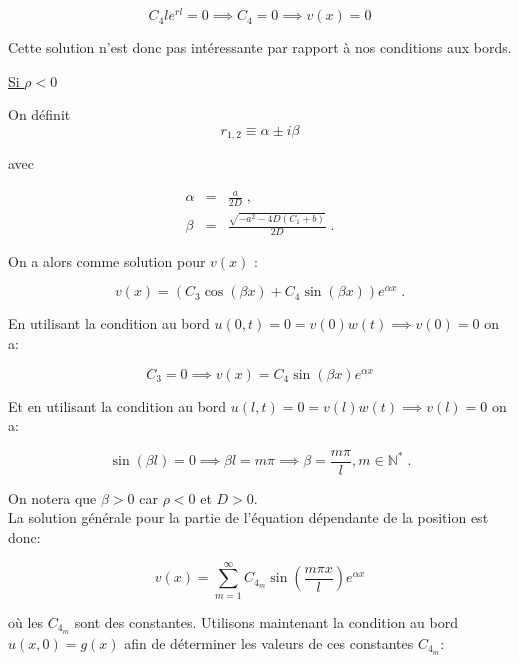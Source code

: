 \documentclass[a4paper, 12pt]{report}
\begin{document}
\begin{equation}
  C_4 l e^{r l} = 0 \implies C_4 = 0 \implies v(x) = 0
\end{equation}

Cette solution n'est donc pas intéressante par rapport à nos conditions aux bords.

\underline{Si $\rho < 0$}

On définit
\begin{equation}
r_{1,2} \equiv \alpha \pm i \beta
\end{equation}

avec

\begin{eqnarray}
  \alpha & = & \frac{a}{2 D}\;,\\
  \beta & = & \frac{\sqrt{-a^{2} - 4 D (C_{1} + b)}}{2 D}\;.\label{beta}
\end{eqnarray}

On a alors comme solution pour $v(x)$ :

\begin{equation}
  v(x) = (C_3 \cos(\beta x) + C_4 \sin(\beta x)) e^{\alpha x}\;.
\end{equation}

En utilisant la condition au bord $u(0,t) = 0 = v(0) w(t) \implies v(0) = 0$ on a:

\begin{equation}
  C_3 = 0 \implies v(x) = C_4 \sin(\beta x) e^{\alpha x}
\end{equation}

Et en utilisant la condition au bord $u(l,t) = 0 = v(l) w(t) \implies v(l) = 0$ on a:

\begin{equation}
  \sin(\beta l) = 0 \implies \beta l = m \pi \implies \beta = \frac{m \pi}{l}, m \in \mathbb{N}^{\ast}\;.
\end{equation}

On notera que $\beta > 0$ car $\rho < 0$ et $D > 0$. \\
La solution générale pour la partie de l'équation dépendante de la position est
donc:

\begin{equation}
  v(x) = \sum_{m=1}^{\infty} C_{4_m} \sin \left (\frac{m \pi x}{l} \right ) e^{\alpha x}
\end{equation}

où les $C_{4_m}$ sont des constantes. Utilisons maintenant la condition au bord
$u(x,0) = g(x)$ afin de déterminer les valeurs de ces constantes $C_{4_m}$:
\end{document}
